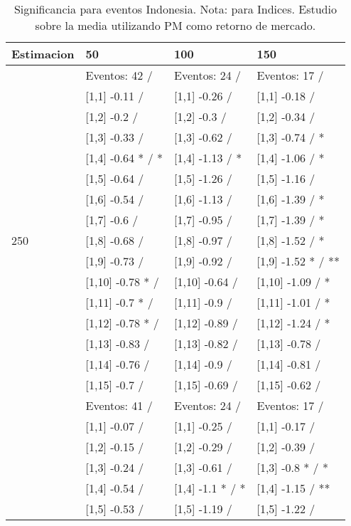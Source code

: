 \begin{table}

\caption{Significancia para eventos Indonesia. Nota: para Indices. Estudio sobre la media utilizando PM como retorno de mercado.}
\centering
\begin{tabular}[t]{llll}
\toprule
Estimacion & 50 & 100 & 150\\
\midrule
 & Eventos:  42 / & Eventos:  24 / & Eventos:  17 /\\
 & {}[1,1] -0.11  / & {}[1,1] -0.26  / & {}[1,1] -0.18  /\\
 & {}[1,2] -0.2  / & {}[1,2] -0.3  / & {}[1,2] -0.34  /\\
 & {}[1,3] -0.33  / & {}[1,3] -0.62  / & {}[1,3] -0.74  / *\\
 & {}[1,4] -0.64 * / * & {}[1,4] -1.13  / * & {}[1,4] -1.06  / *\\
\addlinespace
 & {}[1,5] -0.64  / & {}[1,5] -1.26  / & {}[1,5] -1.16  /\\
 & {}[1,6] -0.54  / & {}[1,6] -1.13  / & {}[1,6] -1.39  / *\\
 & {}[1,7] -0.6  / & {}[1,7] -0.95  / & {}[1,7] -1.39  / *\\
250 & {}[1,8] -0.68  / & {}[1,8] -0.97  / & {}[1,8] -1.52  / *\\
 & {}[1,9] -0.73  / & {}[1,9] -0.92  / & {}[1,9] -1.52 * / **\\
\addlinespace
 & {}[1,10] -0.78 * / & {}[1,10] -0.64  / & {}[1,10] -1.09  / *\\
 & {}[1,11] -0.7 * / & {}[1,11] -0.9  / & {}[1,11] -1.01  / *\\
 & {}[1,12] -0.78 * / & {}[1,12] -0.89  / & {}[1,12] -1.24  / *\\
 & {}[1,13] -0.83  / & {}[1,13] -0.82  / & {}[1,13] -0.78  /\\
 & {}[1,14] -0.76  / & {}[1,14] -0.9  / & {}[1,14] -0.81  /\\
\addlinespace
 & {}[1,15] -0.7  / & {}[1,15] -0.69  / & {}[1,15] -0.62  /\\
 & Eventos:  41 / & Eventos:  24 / & Eventos:  17 /\\
 & {}[1,1] -0.07  / & {}[1,1] -0.25  / & {}[1,1] -0.17  /\\
 & {}[1,2] -0.15  / & {}[1,2] -0.29  / & {}[1,2] -0.39  /\\
 & {}[1,3] -0.24  / & {}[1,3] -0.61  / & {}[1,3] -0.8 * / *\\
\addlinespace
 & {}[1,4] -0.54  / & {}[1,4] -1.1 * / * & {}[1,4] -1.15  / **\\
 & {}[1,5] -0.53  / & {}[1,5] -1.19  / & {}[1,5] -1.22  /\\

\end{tabular}
\end{table}
